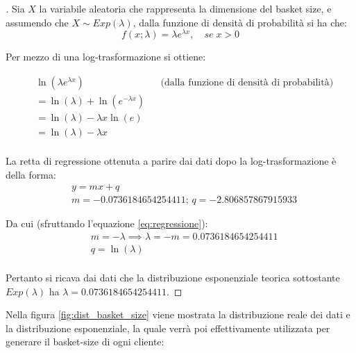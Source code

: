\begin{proof}[\unskip\nopunct]
	Sia $X$ la variabile aleatoria che rappresenta la dimensione del basket size, e assumendo che $X \sim Exp(\lambda)$, dalla funzione di densità di probabilità si ha che:
	$$f(x;\lambda) = \lambda e^{\lambda x}, \quad se \; x > 0$$

	Per mezzo di una log-trasformazione si ottiene:

	\begin{equation}
			\label{eq:regressione}
		\begin{aligned}
			&\ln(\lambda e^{\lambda x}) &&\text{(dalla funzione di densità di probabilità)}\\
			&= \ln(\lambda) + \ln(e^{-\lambda x}) \\
			&= \ln(\lambda) - \lambda x \ln(e) \\
			&= \ln(\lambda) - \lambda x \\
		\end{aligned}
	\end{equation}

	La retta di regressione ottenuta a parire dai dati dopo la log-trasformazione è della forma:
	\begin{align*}
		&y = mx + q\\
		&m = -0.0736184654254411;\, q = -2.806857867915933
	\end{align*}

	Da cui (sfruttando l'equazione \ref{eq:regressione}):
		\begin{align*}
			&m = -\lambda \implies \lambda = -m = 0.0736184654254411\\
			&q = \ln(\lambda)\\
		\end{align*}

	Pertanto si ricava dai dati che la distribuzione esponenziale teorica sottostante $Exp(\lambda)$ ha $\lambda = 0.0736184654254411$.
\end{proof}

Nella figura \ref{fig:dist_basket_size} viene mostrata la distribuzione reale dei dati e la distribuzione esponenziale, la quale verrà poi effettivamente utilizzata per generare il basket-size di ogni cliente:

